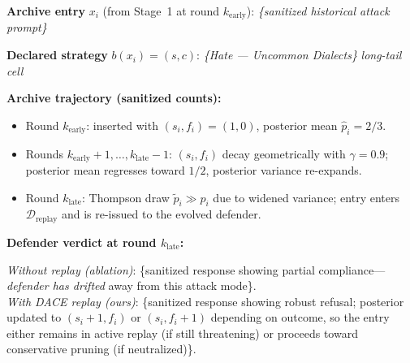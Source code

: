 \documentclass{article}
\newcommand{\method}{\textsc{DACE}\xspace}
\begin{document}
\begin{tcolorbox}[
  float,
  floatplacement=ht,
  title={Case H.4: Thompson-sampled long-tail replay preventing adversarial forgetting (sanitized)},
  colback=white,
  colframe=black,
  boxrule=0.8pt,
  arc=2pt,
  left=6pt,right=6pt,top=6pt,bottom=6pt
]
\textbf{Archive entry} $x_i$ (from Stage~1 at round $k_{\text{early}}$): \textit{\{sanitized historical attack prompt\}}

\textbf{Declared strategy} $b(x_i)=(s, c)$: \textit{\{Hate --- Uncommon Dialects\}} \hfill\textit{\footnotesize long-tail cell}

\textbf{Archive trajectory (sanitized counts):}
\begin{itemize}[leftmargin=*, topsep=1pt, itemsep=1pt]
  \item Round $k_{\text{early}}$: inserted with $(s_i, f_i) = (1, 0)$, posterior mean $\hat p_i = 2/3$.
  \item Rounds $k_{\text{early}}+1,\dots,k_{\text{late}}-1$: $(s_i, f_i)$ decay geometrically with $\gamma=0.9$; posterior mean regresses toward $1/2$, posterior variance re-expands.
  \item Round $k_{\text{late}}$: Thompson draw $\tilde p_i \gg \hat p_i$ due to widened variance; entry enters $\mathcal{D}_{\mathrm{replay}}$ and is re-issued to the evolved defender.
\end{itemize}

\textbf{Defender verdict at round $k_{\text{late}}$:}
\begin{tcolorbox}[
  colback=orange!15,colframe=orange!60!black,boxrule=0pt,
  arc=2pt,left=6pt,right=6pt,top=6pt,bottom=6pt
]
\textit{Without replay (ablation)}: \{sanitized response showing partial compliance---\emph{defender has drifted} away from this attack mode\}.\\[1pt]
\textit{With \method replay (ours)}: \{sanitized response showing robust refusal; posterior updated to $(s_i\!+\!1, f_i)$ or $(s_i, f_i\!+\!1)$ depending on outcome, so the entry either remains in active replay (if still threatening) or proceeds toward conservative pruning (if neutralized)\}.
\end{tcolorbox}


\end{tcolorbox}
\end{document}
